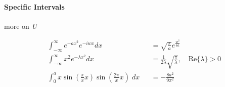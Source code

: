\paragraph{Specific Intervals}
more on \textit{U}
\begin{footnotesize}
    \noindent\begin{align*}
         & \int_{-\infty}^{\infty}e^{-ax^2}e^{-iwx} dx                                        &  & = \sqrt{\frac{\pi}{a}}e^{\frac{w^2}{4a}}                                          \\
         & \int_{-\infty}^{\infty}x^2e^{-\lambda x^2}dx                                       &  & = \frac{1}{2\lambda }\sqrt{\frac{\pi}{\lambda }},\quad \mathrm{Re}\{\lambda \} >0 \\
         & \int_{0}^{a} x\sin\left(\frac{\pi}{x}x\right)\sin\left(\frac{2\pi}{x}x\right)\; dx &  & = -\frac{8a^2}{9\pi^2}
    \end{align*} 
\end{footnotesize}
